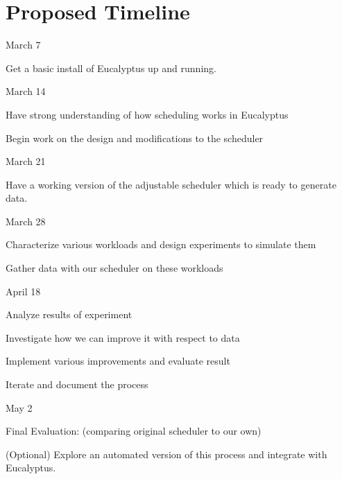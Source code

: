 \section{Proposed Timeline}
\begin{itemize*}
\item{March 7}
\begin{itemize*}
  \item Get a basic install of Eucalyptus up and running.
\end{itemize*}
\item{March 14}
\begin{itemize*}
  \item Have strong understanding of how scheduling works in Eucalyptus
  \item Begin work on the design and modifications to the scheduler
\end{itemize*}
\item{March 21}
\begin{itemize*}
  \item Have a working version of the adjustable scheduler which is ready to
    generate data.
\end{itemize*}
\item{March 28}
\begin{itemize*}
  \item Characterize various workloads and design experiments to simulate them
  \item Gather data with our scheduler on these workloads
\end{itemize*}
\item{April 18}
\begin{itemize*}
  \item Analyze results of experiment
  \item Investigate how we can improve it with respect to data
  \item Implement various improvements and evaluate result
  \item Iterate and document the process
\end{itemize*}
\item{May 2}
\begin{itemize*}
  \item Final Evaluation: (comparing original scheduler to our own)
  \item (Optional) Explore an automated version of this process and integrate
    with Eucalyptus.
\end{itemize*}
\end{itemize*}
